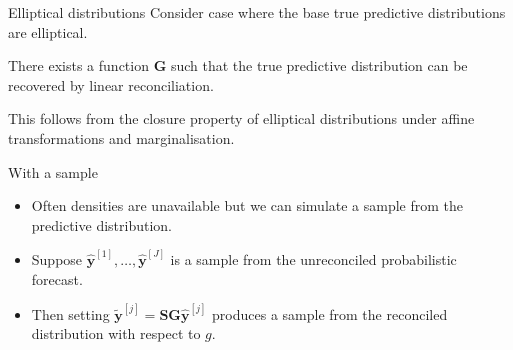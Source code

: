\documentclass[handout]{beamer}
\begin{document}
  \begin{frame}{Elliptical distributions}
  	Consider case where the base true predictive distributions are elliptical.
  	\begin{theorem}
  		There exists a function $\bm{G}$ such that the true predictive distribution can be recovered by linear reconciliation.
  	\end{theorem}
    This follows from the closure property of elliptical distributions under affine transformations and marginalisation.  
  \end{frame}
  \begin{frame}{With a sample}
  	\begin{itemize}
  		\item Often densities are unavailable but we can simulate a sample from the predictive distribution.
  		\item Suppose $\bm{\hat{y}}^{[1]},\ldots,\bm{\hat{y}}^{[J]}$ is a sample from the unreconciled probabilistic forecast.
  		\item Then setting $\tilde{\bm y}^{[j]}=\bm{S}\bm{G}\hat{\bm y}^{[j]}$ produces a sample from the reconciled distribution with respect to $g$.
  	\end{itemize}
  \end{frame}
\end{document}
